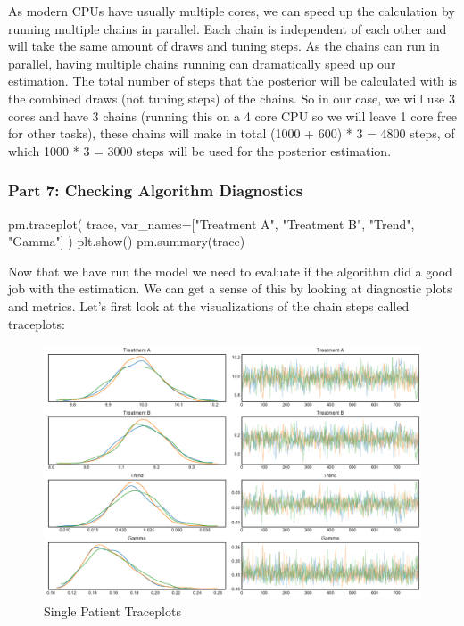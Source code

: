 \documentclass[12pt,a4paper,leqno]{report}
\theoremstyle{plain}
\theoremstyle{definition}
\theoremstyle{remark}
\begin{document}
As modern CPUs have usually multiple cores, we can speed up the calculation by running
multiple chains in parallel. Each chain is independent of each other and will
take the same amount of draws and tuning steps. As the chains can run in parallel, having
multiple chains running can dramatically speed up our estimation. The total number of steps that
the posterior will be calculated with is the combined draws (not tuning steps) of the
chains. So in our case, we will use 3 cores and have 3 chains (running this on a 4 core
CPU so we will leave 1 core free for other tasks), these chains will make in total (1000 +
600) * 3 = 4800 steps, of which 1000 * 3 = 3000 steps will be used for the posterior estimation.

\subsubsection*{Part 7: Checking Algorithm Diagnostics}

\bigskip
\begin{pyverbatim}[][fontsize=\footnotesize]
    pm.traceplot(
            trace, var_names=["Treatment A", "Treatment B", "Trend", "Gamma"]
        )
    plt.show()
    pm.summary(trace)
\end{pyverbatim}
\smallskip

Now that we have run the model we need to evaluate if the algorithm did a good job with
the estimation. We can get a sense of this by looking at diagnostic plots and metrics.
Let's first look at the visualizations of the chain steps called traceplots:

\begin{figure}[H]
    \caption{Single Patient Traceplots}\label{traceplots}
    \includegraphics[width=\textwidth,height=\textheight,keepaspectratio]{single_patient_traceplot.pdf}
\end{figure}
\end{document}
